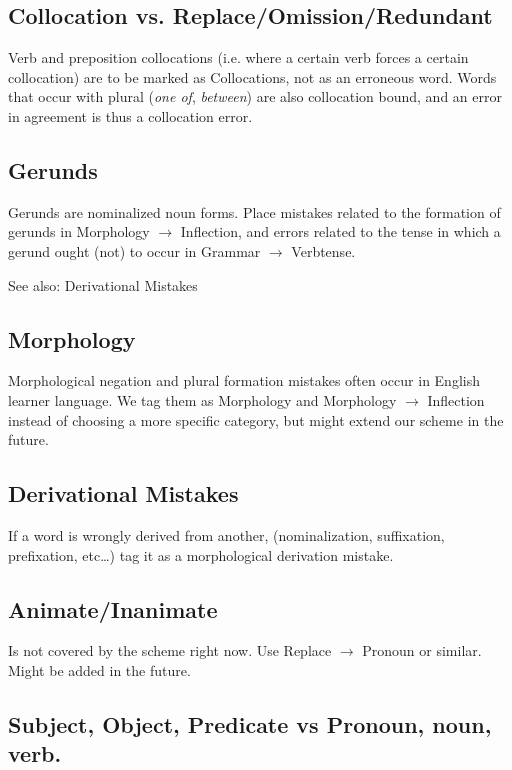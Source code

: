 \documentclass[12pt]{article}
\begin{document}
\subsection{Collocation vs. Replace/Omission/Redundant}

Verb and preposition collocations (i.e. where a certain verb forces a certain
collocation) are to be marked as Collocations, not as an erroneous word. Words
that occur with plural (\textit{one of}, \textit{between}) are also collocation
bound, and an error in agreement is thus a collocation error.

\subsection{Gerunds}

Gerunds are nominalized noun forms.  Place mistakes related to the formation of
gerunds in Morphology $\to$ Inflection, and errors related to the tense in which a
gerund ought (not) to occur in Grammar $\to$ Verbtense.

See also: Derivational Mistakes

\subsection{Morphology}

Morphological negation and plural formation mistakes often occur in English
learner language. We tag them as Morphology and Morphology $\to$ Inflection instead
of choosing a more specific category, but might extend our scheme in the future.

\subsection{Derivational Mistakes}

If a word is wrongly derived from another, (nominalization, suffixation,
prefixation, etc\ldots) tag it as a morphological derivation mistake.

\subsection{Animate/Inanimate}

Is not covered by the scheme right now. Use Replace $\to$ Pronoun or similar. Might
be added in the future.

\subsection{Subject, Object, Predicate vs Pronoun, noun, verb.}
\end{document}

